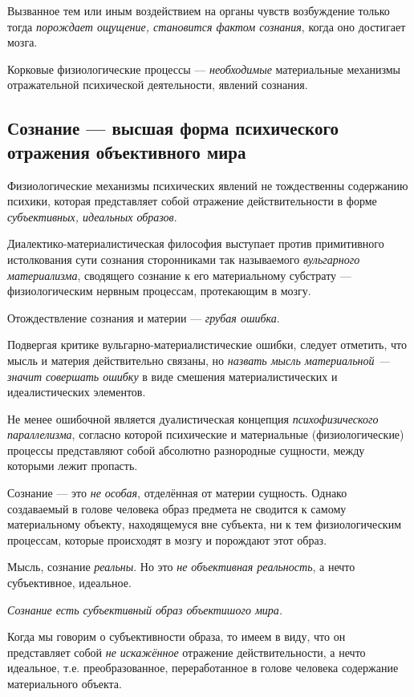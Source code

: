 \documentclass[a4paper,14pt,russian]{extreport}
\begin{document}
Вызванное тем или иным воздействием на органы чувств возбуждение только тогда \emph{порождает ощущение, становится фактом сознания}, когда оно достигает мозга.

Корковые физиологические процессы --- \emph{необходимые} материальные механизмы отражательной психической деятельности, явлений сознания.

\subsection{Сознание --- высшая форма психического отражения объективного мира}

Физиологические механизмы психических явлений не тождественны содержанию психики, которая представляет собой отражение действительности в форме \emph{субъективных, идеальных образов}.

Диалектико-материалистическая философия выступает против примитивного истолкования сути сознания сторонниками так называемого \emph{вульгарного материализма}, сводящего сознание к его материальному субстрату --- физиологическим нервным процессам, протекающим в мозгу.

Отождествление сознания и материи --- \emph{грубая ошибка}.

Подвергая критике вульгарно-материалистические ошибки, следует отметить, что мысль и материя действительно связаны, но \emph{назвать мысль материальной --- значит совершать ошибку} в виде смешения материалистических и идеалистических элементов.

Не менее ошибочной является дуалистическая концепция \emph{психофизического параллелизма}, согласно которой психические и материальные (физиологические) процессы представляют собой абсолютно разнородные сущности, между которыми лежит пропасть.

Сознание --- это \emph{не особая}, отделённая от материи сущность. Однако создаваемый в голове человека образ предмета не сводится к самому материальному объекту, находящемуся вне субъекта, ни к тем физиологическим процессам, которые происходят в мозгу и порождают этот образ.

Мысль, сознание \emph{реальны}. Но это \emph{не объективная реальность}, а нечто субъективное, идеальное.

\emph{Сознание есть субъективный образ объектишого мира.}

Когда мы говорим о субъективности образа, то имеем в виду, что он представляет собой \emph{не искажённое} отражение действительности, а нечто идеальное, т.е. преобразованное, переработанное в голове человека содержание материального объекта.
\end{document}
